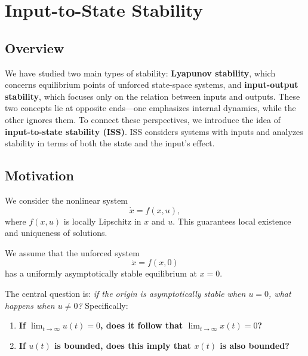 \chapterspaceabove{6.75cm} %
\chapterspacebelow{7.25cm} %

\chapter{Input-to-State Stability}

\section{Overview}
We have studied two main types of stability: \textbf{Lyapunov stability}, which concerns equilibrium points of unforced state-space systems, and \textbf{input-output stability}, which focuses only on the relation between inputs and outputs. These two concepts lie at opposite ends---one emphasizes internal dynamics, while the other ignores them. To connect these perspectives, we introduce the idea of \textbf{input-to-state stability (ISS)}. ISS considers systems with inputs and analyzes stability in terms of both the state and the input’s effect.

\section{Motivation}

We consider the nonlinear system
\begin{equation}
\dot{x} = f(x,u),
\end{equation}
where $f(x,u)$ is locally Lipschitz in $x$ and $u$. This guarantees local existence and uniqueness of solutions.  

\noindent
We assume that the unforced system
\begin{equation}
\dot{x} = f(x,0)
\end{equation}
has a uniformly asymptotically stable equilibrium at $x=0$. 

\noindent
The central question is: \emph{if the origin is asymptotically stable when $u=0$, what happens when $u \neq 0$?} Specifically:
\begin{enumerate}
    \item \textbf{If $\lim_{t \to \infty} u(t) = 0$, does it follow that $\lim_{t \to \infty} x(t) = 0$?}
    \item \textbf{If $u(t)$ is bounded, does this imply that $x(t)$ is also bounded?}
\end{enumerate}

